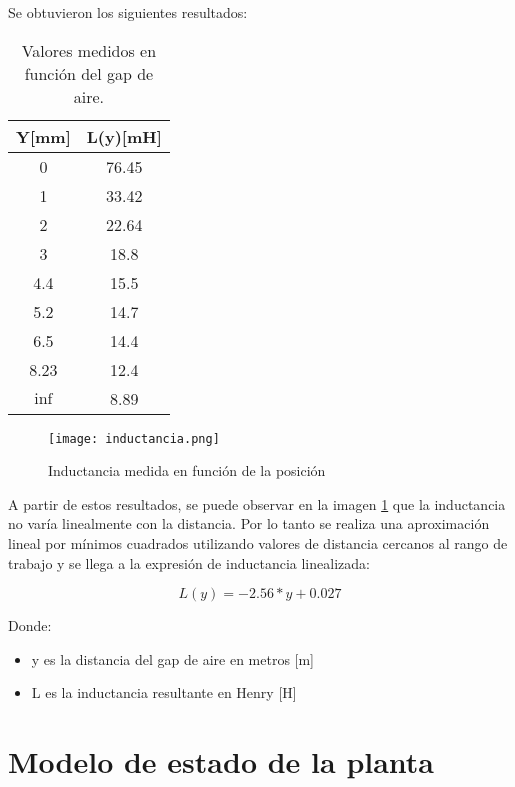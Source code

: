 \noindent Se obtuvieron los siguientes resultados:


\begin{table} [H]
	\begin{center}
		\begin{tabular}{| c | c |}
			\hline
			Y[mm] & L(y)[mH]\\ \hline
			0 & 76.45\\ \hline
			1 & 33.42\\ \hline
			2 & 22.64\\ \hline
			3 & 18.8\\ \hline
			4.4 & 15.5\\ \hline
			5.2 & 14.7\\ \hline
			6.5 & 14.4\\ \hline
			8.23 & 12.4\\ \hline
			$\inf$ & 8.89\\ \hline
		\end{tabular}
	\caption{Valores medidos en función del gap de aire.}
	\label{tab_mediciones_inductancia}
	\end{center}
\end{table}

\begin{figure} [H]
	\centering
	\texttt{[image: inductancia.png]}
	\caption{Inductancia medida en función de la posición}
	\label{fig:img_inductancia_medida}
\end{figure}
\noindent A partir de estos resultados, se puede observar en la imagen \ref{fig:img_inductancia_medida} que la inductancia no varía linealmente con la distancia. Por lo tanto se realiza una aproximación lineal por mínimos cuadrados utilizando valores de distancia cercanos al rango de trabajo y se llega a la expresión de inductancia linealizada:

\begin{equation}
	L(y)=-2.56*y+0.027
\end{equation}

\noindent Donde:
\begin{itemize}
	\item y es la distancia del gap de aire en metros [m]
	\item L es la inductancia resultante en Henry [H]
\end{itemize}


\section{Modelo de estado de la planta}

